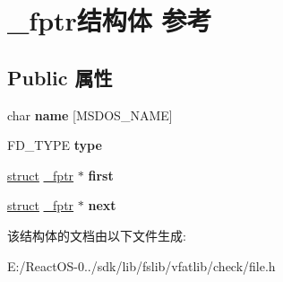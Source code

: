 \hypertarget{struct__fptr}{}\section{\+\_\+fptr结构体 参考}
\label{struct__fptr}
\subsection*{Public 属性}
\begin{DoxyCompactItemize}
\item 
\mbox{\label{struct__fptr_afda250efc9350d4ff999715e8ed1ae69}} 
char {\bfseries name} \mbox{[}M\+S\+D\+O\+S\+\_\+\+N\+A\+ME\mbox{]}
\item 
\mbox{\label{struct__fptr_a409ac543f002e30ccc52f9966d3d14a5}} 
F\+D\+\_\+\+T\+Y\+PE {\bfseries type}
\item 
\mbox{\label{struct__fptr_aaf68762cdb9a4767b783a42cd533d0b9}} 
\hyperlink{interfacestruct}{struct} \hyperlink{struct__fptr}{\+\_\+fptr} $\ast$ {\bfseries first}
\item 
\mbox{\label{struct__fptr_af6646faf3dee32db8e05324a67f2f22c}} 
\hyperlink{interfacestruct}{struct} \hyperlink{struct__fptr}{\+\_\+fptr} $\ast$ {\bfseries next}
\end{DoxyCompactItemize}


该结构体的文档由以下文件生成\+:\begin{DoxyCompactItemize}
\item 
E\+:/\+React\+O\+S-\/0../sdk/lib/fslib/vfatlib/check/file.\+h\end{DoxyCompactItemize}
